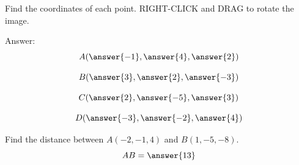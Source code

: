 \documentclass{ximera}
\begin{document}
\begin{problem}\label{prob:geogebrapts}
Find the coordinates of each point.
RIGHT-CLICK and DRAG to rotate the image.


\begin{onlineOnly}
\begin{center} 
\end{center}
\end{onlineOnly}

Answer:
  $$A(\answer{-1}, \answer{4}, \answer{2})$$
 
  $$B(\answer{3}, \answer{2}, \answer{-3})$$

  $$C(\answer{2}, \answer{-5}, \answer{3})$$
  
  $$D(\answer{-3}, \answer{-2}, \answer{4})$$

\end{problem}

\begin{problem}\label{prob:distR3}
Find the distance between $A(-2, -1, 4)$ and $B(1, -5, -8)$.
$$AB=\answer{13}$$
\end{problem}



\end{document}

